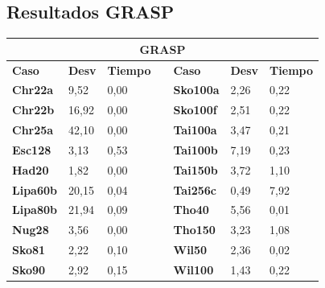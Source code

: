 \documentclass[a4paper, 12pt]{article}
\begin{document}
      \subsection{Resultados GRASP}
      \begin{table}[H]
\centering
\begin{tabular}{|l|l|l|l|l|l|l|}
\hline
\multicolumn{7}{|c|}{\textbf{GRASP}}                                                                                \\ \hline
\textbf{Caso}    & \textbf{Desv} & \textbf{Tiempo} & \textbf{} & \textbf{Caso}    & \textbf{Desv} & \textbf{Tiempo} \\ \cline{1-3} \cline{5-7} 
\textbf{Chr22a}  & 9,52          & 0,00            &           & \textbf{Sko100a} & 2,26          & 0,22            \\ \cline{1-3} \cline{5-7} 
\textbf{Chr22b}  & 16,92         & 0,00            &           & \textbf{Sko100f} & 2,51          & 0,22            \\ \cline{1-3} \cline{5-7} 
\textbf{Chr25a}  & 42,10         & 0,00            &           & \textbf{Tai100a} & 3,47          & 0,21            \\ \cline{1-3} \cline{5-7} 
\textbf{Esc128}  & 3,13          & 0,53            &           & \textbf{Tai100b} & 7,19          & 0,23            \\ \cline{1-3} \cline{5-7} 
\textbf{Had20}   & 1,82          & 0,00            &           & \textbf{Tai150b} & 3,72          & 1,10            \\ \cline{1-3} \cline{5-7} 
\textbf{Lipa60b} & 20,15         & 0,04            &           & \textbf{Tai256c} & 0,49          & 7,92            \\ \cline{1-3} \cline{5-7} 
\textbf{Lipa80b} & 21,94         & 0,09            &           & \textbf{Tho40}   & 5,56          & 0,01            \\ \cline{1-3} \cline{5-7} 
\textbf{Nug28}   & 3,56          & 0,00            &           & \textbf{Tho150}  & 3,23          & 1,08            \\ \cline{1-3} \cline{5-7} 
\textbf{Sko81}   & 2,22          & 0,10            &           & \textbf{Wil50}   & 2,36          & 0,02            \\ \cline{1-3} \cline{5-7} 
\textbf{Sko90}   & 2,92          & 0,15            &           & \textbf{Wil100}  & 1,43          & 0,22            \\ \cline{1-3} \cline{5-7} 
\end{tabular}
\end{table}
\end{document}

